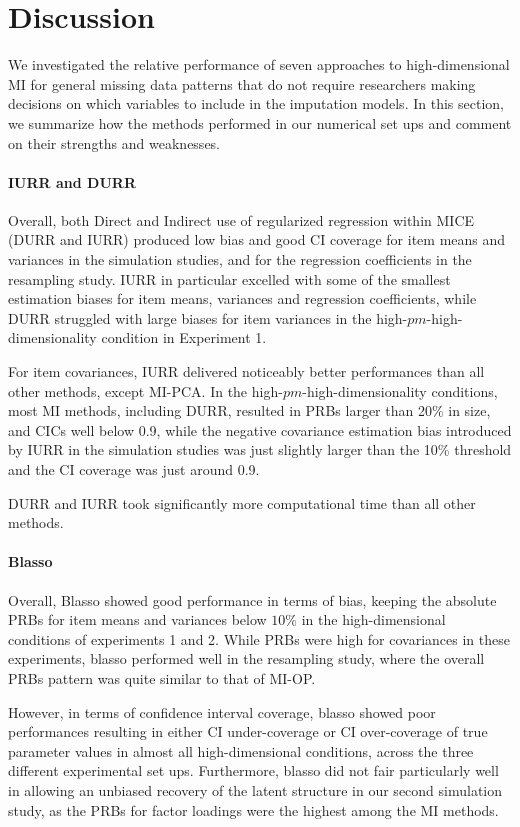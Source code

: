 \section{Discussion}

We investigated the relative performance of seven approaches to high-dimensional MI for general missing data patterns 
that do not require researchers making decisions on which variables to include in the imputation models. 
In this section, we summarize how the methods performed in our numerical set ups and comment on their strengths and weaknesses.

\paragraph{IURR and DURR}
	Overall, both Direct and Indirect use of regularized regression within MICE (DURR and IURR) produced low bias and good 
	CI coverage for item means and variances in the simulation studies, and for the regression coefficients in the 
	resampling study.
	IURR in particular excelled with some of the smallest estimation biases for item means, variances and 
	regression coefficients, while DURR struggled with large biases for item variances in the high-$pm$-high-dimensionality 
	condition in Experiment 1.

	For item covariances, IURR delivered noticeably better performances than all other methods, except MI-PCA.
	In the high-$pm$-high-dimensionality conditions, most MI methods, including DURR, resulted in PRBs larger than
	20\% in size, 
	and CICs well below 0.9, while the negative covariance estimation bias introduced by IURR in the simulation 
	studies was just slightly larger than the 10\% threshold and the CI coverage was just around 0.9.

	DURR and IURR took significantly more computational time than all other methods.

\paragraph{Blasso}
	Overall, Blasso showed good performance in terms of bias, keeping the absolute PRBs for item means 
	and variances below $10\%$ in the high-dimensional conditions of experiments 1 and 2.
	While PRBs were high for covariances in these experiments, blasso performed well in the resampling study, 
	where the overall PRBs pattern was quite similar to that of MI-OP.

	However, in terms of confidence interval coverage, blasso showed poor performances resulting in either CI 
	under-coverage or CI over-coverage of true parameter values in almost all high-dimensional conditions, 
	across the three different experimental set ups.
	Furthermore, blasso did not fair particularly well in allowing an unbiased recovery of the latent structure 
	in our second simulation study, as the PRBs for factor loadings were the highest among the MI methods.

